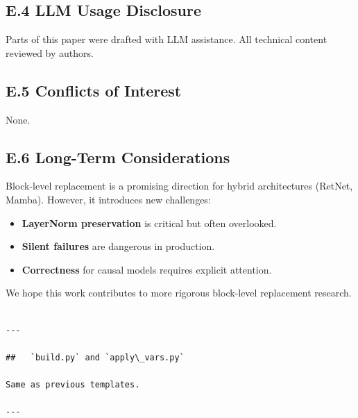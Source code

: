 \subsection{E.4 LLM Usage Disclosure}

Parts of this paper were drafted with LLM assistance. All technical content 
reviewed by authors.

\subsection{E.5 Conflicts of Interest}

None.

\subsection{E.6 Long-Term Considerations}

Block-level replacement is a promising direction for hybrid architectures 
(RetNet, Mamba). However, it introduces new challenges:

\begin{itemize}
\item \textbf{LayerNorm preservation} is critical but often overlooked.
\item \textbf{Silent failures} are dangerous in production.
\item \textbf{Correctness} for causal models requires explicit attention.

\end{itemize}
We hope this work contributes to more rigorous block-level replacement 
research.
\begin{lstlisting}

---

##   `build.py` and `apply\_vars.py`

Same as previous templates.

---
\end{lstlisting}